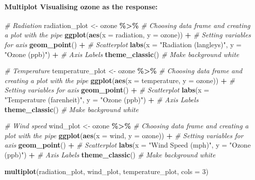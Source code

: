\documentclass[
]{article}
\newenvironment{Shaded}{\begin{snugshade}}{\end{snugshade}}
\newcommand{\AttributeTok}[1]{\textcolor[rgb]{0.13,0.29,0.53}{#1}}
\newcommand{\CommentTok}[1]{\textcolor[rgb]{0.56,0.35,0.01}{\textit{#1}}}
\newcommand{\DecValTok}[1]{\textcolor[rgb]{0.00,0.00,0.81}{#1}}
\newcommand{\FunctionTok}[1]{\textcolor[rgb]{0.13,0.29,0.53}{\textbf{#1}}}
\newcommand{\NormalTok}[1]{#1}
\newcommand{\OtherTok}[1]{\textcolor[rgb]{0.56,0.35,0.01}{#1}}
\newcommand{\SpecialCharTok}[1]{\textcolor[rgb]{0.81,0.36,0.00}{\textbf{#1}}}
\newcommand{\StringTok}[1]{\textcolor[rgb]{0.31,0.60,0.02}{#1}}
\begin{document}
\paragraph{Multiplot Visualising ozone as the
response:}\label{multiplot-visualising-ozone-as-the-response}

\begin{Shaded}
\begin{Highlighting}[]
\CommentTok{\# Radiation}
\NormalTok{radiation\_plot }\OtherTok{\textless{}{-}}\NormalTok{ ozone }\SpecialCharTok{\%\textgreater{}\%}  \CommentTok{\# Choosing data frame and creating a plot with the pipe}
  \FunctionTok{ggplot}\NormalTok{(}\FunctionTok{aes}\NormalTok{(}\AttributeTok{x =}\NormalTok{ radiation, }\AttributeTok{y =}\NormalTok{ ozone)) }\SpecialCharTok{+}  \CommentTok{\# Setting variables for axis}
  \FunctionTok{geom\_point}\NormalTok{() }\SpecialCharTok{+}  \CommentTok{\# Scatterplot}
  \FunctionTok{labs}\NormalTok{(}\AttributeTok{x =} \StringTok{"Radiation (langleys)"}\NormalTok{, }\AttributeTok{y =} \StringTok{"Ozone (ppb)"}\NormalTok{) }\SpecialCharTok{+} \CommentTok{\# Axis Labels }
  \FunctionTok{theme\_classic}\NormalTok{()  }\CommentTok{\# Make background white}

\CommentTok{\# Temperature}
\NormalTok{temperature\_plot }\OtherTok{\textless{}{-}}\NormalTok{ ozone }\SpecialCharTok{\%\textgreater{}\%}  \CommentTok{\# Choosing data frame and creating a plot with the pipe}
  \FunctionTok{ggplot}\NormalTok{(}\FunctionTok{aes}\NormalTok{(}\AttributeTok{x =}\NormalTok{ temperature, }\AttributeTok{y =}\NormalTok{ ozone)) }\SpecialCharTok{+}  \CommentTok{\# Setting variables for axis}
  \FunctionTok{geom\_point}\NormalTok{() }\SpecialCharTok{+}  \CommentTok{\# Scatterplot}
  \FunctionTok{labs}\NormalTok{(}\AttributeTok{x =} \StringTok{"Temperature (farenheit)"}\NormalTok{, }\AttributeTok{y =} \StringTok{"Ozone (ppb)"}\NormalTok{) }\SpecialCharTok{+} \CommentTok{\# Axis Labels }
  \FunctionTok{theme\_classic}\NormalTok{()  }\CommentTok{\# Make background white}

\CommentTok{\# Wind speed}
\NormalTok{wind\_plot }\OtherTok{\textless{}{-}}\NormalTok{ ozone }\SpecialCharTok{\%\textgreater{}\%}  \CommentTok{\# Choosing data frame and creating a plot with the pipe}
  \FunctionTok{ggplot}\NormalTok{(}\FunctionTok{aes}\NormalTok{(}\AttributeTok{x =}\NormalTok{ wind, }\AttributeTok{y =}\NormalTok{ ozone)) }\SpecialCharTok{+}  \CommentTok{\# Setting variables for axis}
  \FunctionTok{geom\_point}\NormalTok{() }\SpecialCharTok{+}  \CommentTok{\# Scatterplot}
  \FunctionTok{labs}\NormalTok{(}\AttributeTok{x =} \StringTok{"Wind Speed (mph)"}\NormalTok{, }\AttributeTok{y =} \StringTok{"Ozone (ppb)"}\NormalTok{) }\SpecialCharTok{+} \CommentTok{\# Axis Labels }
  \FunctionTok{theme\_classic}\NormalTok{()  }\CommentTok{\# Make background white}


\FunctionTok{multiplot}\NormalTok{(radiation\_plot, wind\_plot, temperature\_plot, }\AttributeTok{cols =} \DecValTok{3}\NormalTok{)}
\end{Highlighting}
\end{Shaded}
\end{document}
